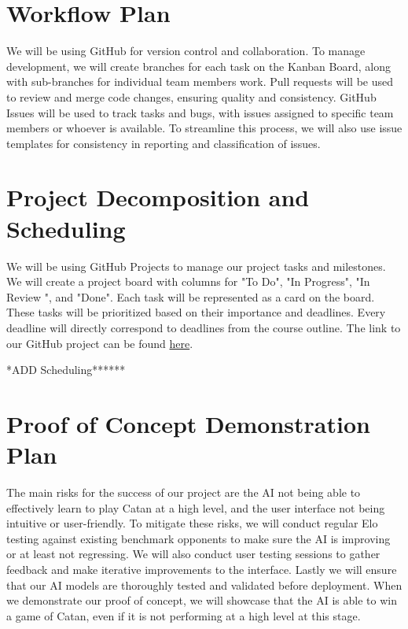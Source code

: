 \documentclass{article}
\begin{document}
\section{Workflow Plan}

\raggedright
We will be using GitHub for version control and collaboration.
To manage development, we will create branches for each task on the Kanban Board,
along with sub-branches for individual team members work. Pull requests 
will be used to review and merge code changes, ensuring quality and 
consistency. GitHub Issues will be used to track tasks and bugs, with 
issues assigned to specific team members or whoever is available.
To streamline this process, we will also use issue templates for 
consistency in reporting and classification of issues. 

\section{Project Decomposition and Scheduling}


\raggedright
We will be using GitHub Projects to manage our project tasks and milestones. We
will create a project board with columns for "To Do", "In Progress", "In Review
", and "Done". Each task will be represented as a card on the board. These tasks
will be prioritized based on their importance and deadlines. Every deadline will
directly correspond to deadlines from the course outline.
The link to our GitHub project can be found
\href{https://github.com/users/SY3141/projects/1}{here}.


*ADD Scheduling******

\section{Proof of Concept Demonstration Plan}

\raggedright
The main risks for the success of our project are the AI not 
being able to effectively learn to play Catan at a high level, 
and the user interface not being intuitive or user-friendly. 
To mitigate these risks, we will conduct regular Elo testing
against existing benchmark opponents to make sure the AI is 
improving or at least not regressing. We will also conduct user 
testing sessions to  gather feedback and make iterative improvements to the interface. 
Lastly we will ensure that our AI models are thoroughly tested and 
validated before deployment. When we demonstrate our proof of concept,
we will showcase that the AI is able to win a game of Catan, even if
it is not performing at a high level at this stage.
\end{document}
